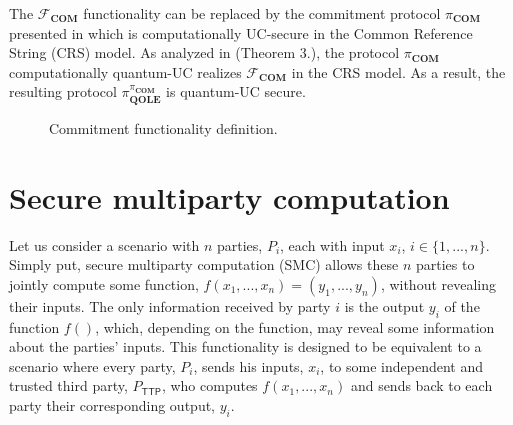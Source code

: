 The $\mathcal{F}_{\textbf{COM}}$ functionality can be replaced by the commitment protocol $\pi_{\textbf{COM}}$ presented in \cite{C01} which is computationally UC-secure in the Common Reference String (CRS) model. As analyzed in \cite{CBGLM21} (Theorem 3.), the protocol $\pi_{\textbf{COM}}$ computationally quantum-UC realizes $\mathcal{F}_{\textbf{COM}}$ in the CRS model. As a result, the resulting protocol $\pi_{\textbf{QOLE}}^{\pi_{\textbf{COM}}}$ is quantum-UC secure.


\begin{figure}[!h]
\centering
{}
\caption{Commitment functionality definition.}
\label{fig:func_com}
\end{figure}




\section{Secure multiparty computation}

Let us consider a scenario with $n$ parties, $P_i$, each with input $x_i$, $i\in \{ 1, ..., n\}$. Simply put, secure multiparty computation (SMC) allows these $n$ parties to jointly compute some function, $f( x_1, ..., x_n ) = (y_1, ..., y_n)$, without revealing their inputs. The only information received by party $i$ is the output $y_i$ of the function $f()$, which, depending on the function, may reveal some information about the parties' inputs. This functionality is designed to be equivalent to a scenario where every party, $P_i$, sends his inputs, $x_i$, to some independent and trusted third party, $P_{\mathsf{TTP}}$, who computes $f( x_1, ..., x_n )$ and sends back to each party their corresponding output, $y_i$.


